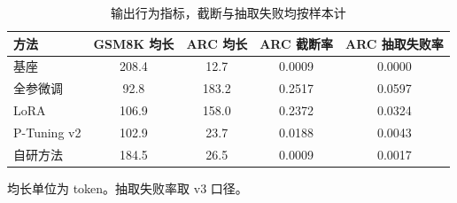 \begin{table}[htbp]
\centering
\caption{输出行为指标，截断与抽取失败均按样本计}
\label{tab:behavior}
\begin{tabular}{lSSSS}
\toprule
方法 & {GSM8K 均长} & {ARC 均长} & {ARC 截断率} & {ARC 抽取失败率} \\
\midrule
基座 & 208.4 & 12.7 & 0.0009 & 0.0000 \\
全参微调 & 92.8 & 183.2 & 0.2517 & 0.0597 \\
LoRA & 106.9 & 158.0 & 0.2372 & 0.0324 \\
P-Tuning v2 & 102.9 & 23.7 & 0.0188 & 0.0043 \\
自研方法 & 184.5 & 26.5 & 0.0009 & 0.0017 \\
\bottomrule
\end{tabular}
\begin{minipage}{\linewidth}
\vspace{0.3em}\footnotesize 均长单位为 token。抽取失败率取 v3 口径。
\end{minipage}
\end{table}
